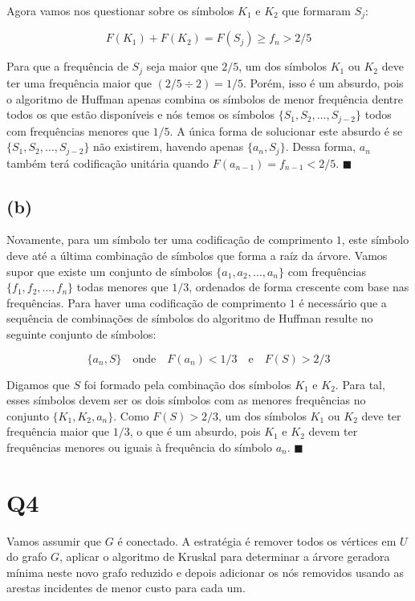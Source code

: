 \documentclass[12pt, a4paper]{article}
\begin{document}
Agora vamos nos questionar sobre os símbolos $K_1$ e $K_2$ que formaram $S_j$:

\[ F(K_1) + F(K_2) = F(S_j) \geq f_n > 2/5 \]

Para que a frequência de $S_j$ seja maior que $2/5$, um dos símbolos $K_1$ ou $K_2$ deve ter uma frequência maior que $(2/5 \div 2)=1/5$. Porém, isso é um absurdo, pois o algoritmo de Huffman apenas combina os símbolos de menor frequência dentre todos os que estão disponíveis e nós temos os símbolos $\{ S_1, S_2, \ldots, S_{j-2} \}$ todos com frequências menores que $1/5$. A única forma de solucionar este absurdo é se $\{ S_1, S_2, \ldots, S_{j-2} \}$ não existirem, havendo apenas $\{a_n, S_j\}$. Dessa forma, $a_n$ também terá codificação unitária quando $F(a_{n-1})=f_{n-1}<2/5$. $\blacksquare$

\subsection*{(b)}

Novamente, para um símbolo ter uma codificação de comprimento $1$, este símbolo deve  até a última combinação de símbolos que forma a raíz da árvore. Vamos supor que existe um conjunto de símbolos $\{a_1, a_2, \ldots,a_n\}$ com frequências $\{f_1, f_2, \ldots, f_n\}$ todas menores que $1/3$, ordenados de forma crescente com base nas frequências. Para haver uma codificação de comprimento $1$ é necessário que a sequência de combinações de símbolos do algoritmo de Huffman resulte no seguinte conjunto de símbolos:

\[ \{a_n, S\} \quad \textrm{onde} \quad F(a_n) < 1/3 \quad \textrm{e} \quad F(S) > 2/3 \]

Digamos que $S$ foi formado pela combinação dos símbolos $K_1$ e $K_2$. Para tal, esses símbolos devem ser os dois símbolos com as menores frequências no conjunto $\{K_1, K_2, a_n\}$. Como $F(S)>2/3$, um dos símbolos $K_1$ ou $K_2$ deve ter frequência maior que $1/3$, o que é um absurdo, pois $K_1$ e $K_2$ devem ter frequências menores ou iguais à frequência do símbolo $a_n$. $\blacksquare$


\section*{Q4}

Vamos assumir que $G$ é conectado. A estratégia é remover todos os vértices em $U$ do grafo $G$, aplicar o algoritmo de Kruskal para determinar a árvore geradora mínima neste novo grafo reduzido e depois adicionar os nós removidos usando as arestas incidentes de menor custo para cada um.
\end{document}
